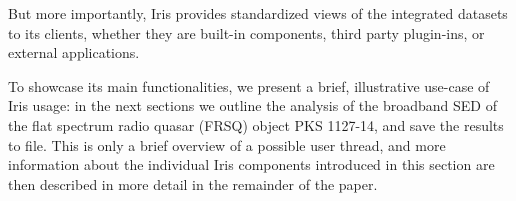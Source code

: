 \documentclass[final,5p,authoryear]{elsarticle}
\begin{document}
But more importantly, Iris provides standardized views of the integrated
datasets to its clients, whether they are built-in components, third party
plugin-ins, or external applications.


To showcase its main functionalities, we present a brief, illustrative use-case
of Iris usage: in the next sections we outline the analysis of the broadband SED
of the flat spectrum radio quasar (FRSQ) object PKS 1127-14, and save the
results to file. This is only a brief overview of a possible user thread, and
more information about the individual Iris components introduced in this section
are then described in more detail in the remainder of the paper.



\end{document}
